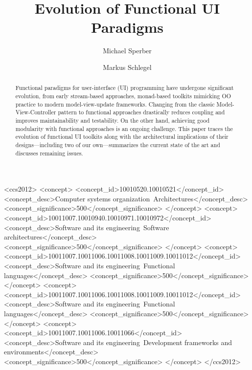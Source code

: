\documentclass[sigplan,screen]{acmart}
\begin{document}
\title{Evolution of Functional UI Paradigms}

\author{Michael Sperber}

\author{Markus Schlegel}

\begin{abstract}
  Functional paradigms for user-interface (UI) programming have
  undergone significant evolution, from early
  stream-based approaches, monad-based toolkits mimicking OO practice
  to modern model-view-update frameworks.  Changing from the
  classic Model-View-Controller pattern to
  functional approaches 
  drastically reduces coupling and improves maintainability and
  testability.  On the other hand, achieving good modularity with
  functional approaches is an ongoing challenge.  This paper traces
  the evolution of functional UI toolkits along with the architectural
  implications of their designs---including two of our own---summarizes
  the current state of the art and discusses remaining issues.
\end{abstract}

\begin{CCSXML}
<ccs2012>
   <concept>
       <concept_id>10010520.10010521</concept_id>
       <concept_desc>Computer systems organization~Architectures</concept_desc>
       <concept_significance>500</concept_significance>
       </concept>
   <concept>
       <concept_id>10011007.10010940.10010971.10010972</concept_id>
       <concept_desc>Software and its engineering~Software architectures</concept_desc>
       <concept_significance>500</concept_significance>
       </concept>
   <concept>
       <concept_id>10011007.10011006.10011008.10011009.10011012</concept_id>
       <concept_desc>Software and its engineering~Functional languages</concept_desc>
       <concept_significance>500</concept_significance>
       </concept>
   <concept>
       <concept_id>10011007.10011006.10011008.10011009.10011012</concept_id>
       <concept_desc>Software and its engineering~Functional languages</concept_desc>
       <concept_significance>500</concept_significance>
       </concept>
    <concept>
        <concept_id>10011007.10011006.10011066</concept_id>
        <concept_desc>Software and its engineering~Development frameworks and environments</concept_desc>
        <concept_significance>500</concept_significance>
    </concept>
</ccs2012>
\end{CCSXML}
\end{document}
